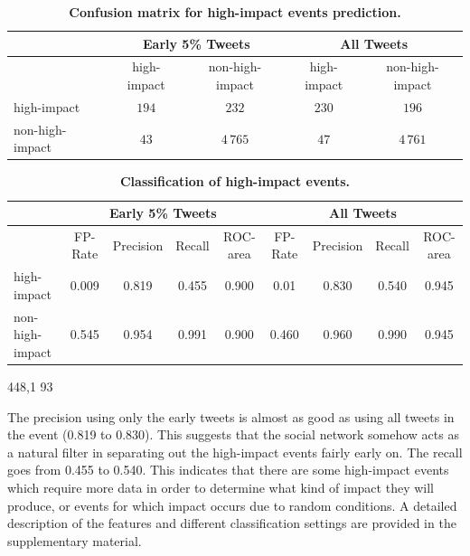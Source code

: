 \documentclass[10pt,letterpaper]{article}
\newcommand{\inblue}[1]{{\color{MyBlue}\sf\textbf{\textsc{#1}}}}
\newcommand{\supplementary}[0]{\inblue{[Supplementary Material]}}
\begin{document}
\begin{table}
  \centering
  \begin{tabular}{lcc|cc}
    \toprule
    \multirow{2}{*}{ }& \multicolumn{2}{c}{Early 5\% Tweets} & \multicolumn{2}{c}{All Tweets} \\
    \midrule
    & high-impact & non-high-impact & high-impact & non-high-impact \\
    high-impact & $194$ & $232$ & $230$ & $196$\\
    non-high-impact & $43$ & $4\,765$ & $47$ & $4\,761$ \\
    \bottomrule
  \end{tabular}
  \caption{\textbf{Confusion matrix for high-impact events prediction.}}
  \label{tab:confusion_matrix}
\end{table}
\begin{table}

  \centering
  {\small
    \begin{tabular}{lcccc|cccc}
      \toprule
      & \multicolumn{4}{c}{Early 5\% Tweets} & \multicolumn{4}{c}{All Tweets} \\
      \midrule
      & FP-Rate & Precision & Recall & ROC-area & FP-Rate & Precision & Recall & ROC-area \\
      high-impact & 0.009 & 0.819 & 0.455 & 0.900 & 0.01 & 0.830 & 0.540 & 0.945 \\
      non-high-impact & 0.545 & 0.954 & 0.991 & 0.900 &  0.460 & 0.960 & 0.990 & 0.945 \\
      \bottomrule
    \end{tabular}
  }
  \caption{\textbf{Classification of high-impact events.}}
  \label{tab:classification_results}
                                                                                                                                448,1         93%
\end{table}


The precision 
using only the early tweets is almost as good as using all
tweets in the event (0.819 to 0.830). This suggests that the social network somehow acts
as a natural filter in separating out the high-impact events fairly
early on.  The
recall goes from 0.455 to 0.540. This indicates that there are some
high-impact events which require more data in order to determine what
kind of impact they will produce, or events for which impact occurs
due to random conditions. A detailed description of the features and
different classification settings are provided in the supplementary
material.%
\end{document}
